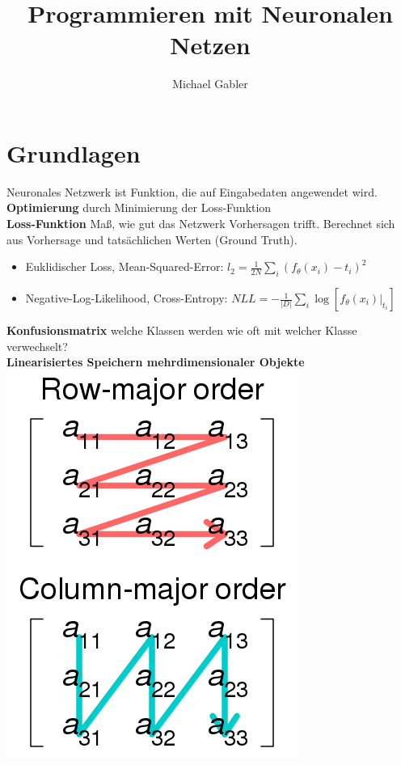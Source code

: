 \documentclass[12pt]{article}
\begin{document}
	\title{Programmieren mit Neuronalen Netzen}
	\author{Michael Gabler}
	\maketitle
	\tableofcontents
	\newpage

	\section{Grundlagen}
	Neuronales Netzwerk ist Funktion, die auf Eingabedaten angewendet wird.\\
	\textbf{Optimierung} durch Minimierung der Loss-Funktion\\
	\textbf{Loss-Funktion} Maß, wie gut das Netzwerk Vorhersagen trifft. Berechnet sich aus Vorhersage und tatsächlichen Werten (Ground Truth).
	\begin{itemize}
		\item Euklidischer Loss, Mean-Squared-Error: $l_2 = \frac{1}{2N} \sum_i (f_\theta(x_i)-t_i)^2$
		\item Negative-Log-Likelihood, Cross-Entropy: $NLL = -\frac{1}{|D|}\sum_i \log[f_\theta(x_i)|_{t_i}]$
	\end{itemize}
	\textbf{Konfusionsmatrix} welche Klassen werden wie oft mit welcher Klasse verwechselt?\\
	\textbf{Linearisiertes Speichern mehrdimensionaler Objekte}\\
	\includegraphics[width=0.25\linewidth]{figures/row-column-major.png}\\

	
\end{document}
